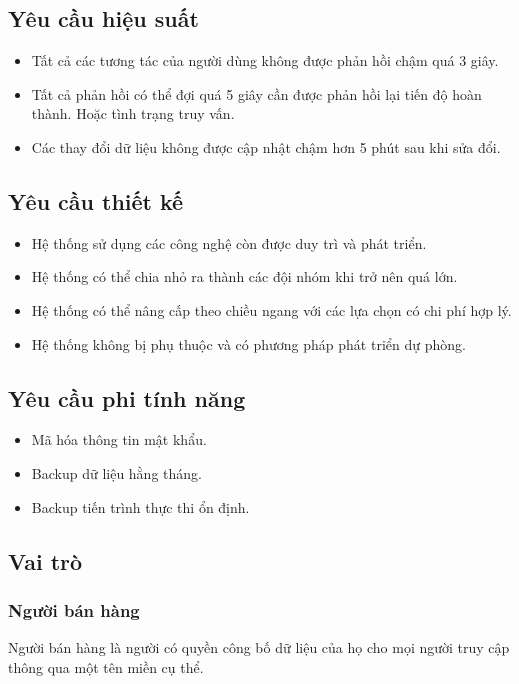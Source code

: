 \documentclass[11pt]{report}
\begin{document}
	\subsection{Yêu cầu hiệu suất}
	\begin{itemize}
		\item Tất cả các tương tác của người dùng không được phản hồi chậm quá 3 giây.
		\item Tất cả phản hồi có thể đợi quá 5 giây cần được phản hồi lại tiến độ hoàn thành. Hoặc tình trạng truy vấn.
		\item Các thay đổi dữ liệu không được cập nhật chậm hơn 5 phút sau khi sửa đổi.
	\end{itemize}
	
	\subsection{Yêu cầu thiết kế}
	\begin{itemize}
		\item Hệ thống sử dụng các công nghệ còn được duy trì và phát triển.
		\item Hệ thống có thể chia nhỏ ra thành các đội nhóm khi trở nên quá lớn.
		\item Hệ thống có thể nâng cấp theo chiều ngang với các lựa chọn có chi phí hợp lý.
		\item Hệ thống không bị phụ thuộc và có phương pháp phát triển dự phòng.
	\end{itemize}
	
	\subsection{Yêu cầu phi tính năng}
	\begin{itemize}
		\item Mã hóa thông tin mật khẩu.
		\item Backup dữ liệu hằng tháng.
		\item Backup tiến trình thực thi ổn định.
	\end{itemize}
	
	\subsection{Vai trò}
	\subsubsection{Người bán hàng}
	Người bán hàng là người có quyền công bố dữ liệu của họ cho mọi người truy cập thông qua một tên miền cụ thể.
	
\end{document}
